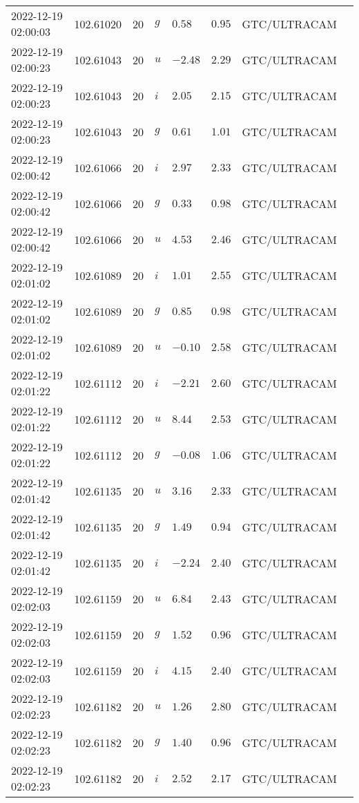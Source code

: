 \documentclass{nature_plusfigure}
\begin{document}
\begin{supplement}
\begin{center}
\begin{longtable}{llllllll}
2022-12-19 02:00:03 & 102.61020 & 20 & $g$ & $0.58$ & $0.95$ & GTC/ULTRACAM &  \\ 
2022-12-19 02:00:23 & 102.61043 & 20 & $u$ & $-2.48$ & $2.29$ & GTC/ULTRACAM &  \\ 
2022-12-19 02:00:23 & 102.61043 & 20 & $i$ & $2.05$ & $2.15$ & GTC/ULTRACAM &  \\ 
2022-12-19 02:00:23 & 102.61043 & 20 & $g$ & $0.61$ & $1.01$ & GTC/ULTRACAM &  \\ 
2022-12-19 02:00:42 & 102.61066 & 20 & $i$ & $2.97$ & $2.33$ & GTC/ULTRACAM &  \\ 
2022-12-19 02:00:42 & 102.61066 & 20 & $g$ & $0.33$ & $0.98$ & GTC/ULTRACAM &  \\ 
2022-12-19 02:00:42 & 102.61066 & 20 & $u$ & $4.53$ & $2.46$ & GTC/ULTRACAM &  \\ 
2022-12-19 02:01:02 & 102.61089 & 20 & $i$ & $1.01$ & $2.55$ & GTC/ULTRACAM &  \\ 
2022-12-19 02:01:02 & 102.61089 & 20 & $g$ & $0.85$ & $0.98$ & GTC/ULTRACAM &  \\ 
2022-12-19 02:01:02 & 102.61089 & 20 & $u$ & $-0.10$ & $2.58$ & GTC/ULTRACAM &  \\ 
2022-12-19 02:01:22 & 102.61112 & 20 & $i$ & $-2.21$ & $2.60$ & GTC/ULTRACAM &  \\ 
2022-12-19 02:01:22 & 102.61112 & 20 & $u$ & $8.44$ & $2.53$ & GTC/ULTRACAM &  \\ 
2022-12-19 02:01:22 & 102.61112 & 20 & $g$ & $-0.08$ & $1.06$ & GTC/ULTRACAM &  \\ 
2022-12-19 02:01:42 & 102.61135 & 20 & $u$ & $3.16$ & $2.33$ & GTC/ULTRACAM &  \\ 
2022-12-19 02:01:42 & 102.61135 & 20 & $g$ & $1.49$ & $0.94$ & GTC/ULTRACAM &  \\ 
2022-12-19 02:01:42 & 102.61135 & 20 & $i$ & $-2.24$ & $2.40$ & GTC/ULTRACAM &  \\ 
2022-12-19 02:02:03 & 102.61159 & 20 & $u$ & $6.84$ & $2.43$ & GTC/ULTRACAM &  \\ 
2022-12-19 02:02:03 & 102.61159 & 20 & $g$ & $1.52$ & $0.96$ & GTC/ULTRACAM &  \\ 
2022-12-19 02:02:03 & 102.61159 & 20 & $i$ & $4.15$ & $2.40$ & GTC/ULTRACAM &  \\ 
2022-12-19 02:02:23 & 102.61182 & 20 & $u$ & $1.26$ & $2.80$ & GTC/ULTRACAM &  \\ 
2022-12-19 02:02:23 & 102.61182 & 20 & $g$ & $1.40$ & $0.96$ & GTC/ULTRACAM &  \\ 
2022-12-19 02:02:23 & 102.61182 & 20 & $i$ & $2.52$ & $2.17$ & GTC/ULTRACAM &  \\ 

\end{longtable}
\end{center}
\end{supplement}
\end{document}
